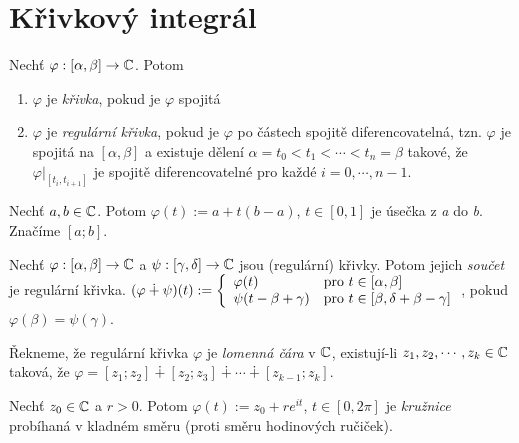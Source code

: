 \section{\texorpdfstring{Křivkový integrál}{Krivkový integrál}}
\setcounter{equation}{0}
\begin{definition}
Nechť $\varphi:[\alpha,\beta] \rightarrow \operatorname{\mathbb{C}}  $. Potom
\begin{enumerate}
    \item $\varphi$ je \emph{křivka}, pokud je $\varphi$ spojitá
    \item $\varphi$ je \emph{regulární křivka}, pokud je $\varphi$ po částech spojitě diferencovatelná, tzn. $\varphi$ je spojitá na $[\alpha,\beta]$ a existuje dělení $\alpha = t_0<t_1<\cdots <t_n=\beta$ takové, že
    $\varphi \big\rvert
     _{[t_i,t_{i+1}]} 
    $ je spojitě diferencovatelné pro každé $i=0,\cdots,n-1$.
\end{enumerate}
\end{definition}

\begin{definition}[Úsečka]
Nechť $a, b \in \operatorname{\mathbb{C}}  $. Potom $\varphi(t):= a + t(b-a)$, $ t \in [0,1]$ je úsečka z \emph{a} do \emph{b}. Značíme $[a;b]$.%
\end{definition} 

\begin{notation}
Nechť $\varphi:[\alpha,\beta]\rightarrow\operatorname{\mathbb{C}}  $ a $\psi:[\gamma,\delta]\rightarrow\operatorname{\mathbb{C}}  $ jsou (regulární) křivky. Potom jejich \emph{součet} je regulární křivka.
$(\varphi \dotplus \psi)(t) := 
\left\{ \begin{array}{ll}  \varphi(t)  & \mbox{pro } t \in[\alpha,\beta] \\ \psi(t-\beta+\gamma) & \mbox{pro } t \in[\beta,\delta+\beta-\gamma] \end{array} \right.$, pokud $\varphi(\beta)=\psi(\gamma)$.
\end{notation}

\begin{definition}
Řekneme, že regulární křivka $\varphi$ je \emph{lomenná čára} v $\operatorname{\mathbb{C}}  $, existují-li $z_1,z_2,\cdots,z_k \in \operatorname{\mathbb{C}}  $ taková, že $\varphi=[z_1;z_2]\dotplus[z_2;z_3]\dotplus\cdots\dotplus[z_{k-1};z_k]$.%
\end{definition}

\begin{definition}[Kružnice]
Nechť $z_0\in\operatorname{\mathbb{C}}  $ a $r>0$. Potom $\varphi(t):=z_0+re^{it}$, $t\in [0,2\pi]$ je \emph{kružnice} probíhaná v kladném směru (proti směru hodinových ručiček).
\end{definition}


